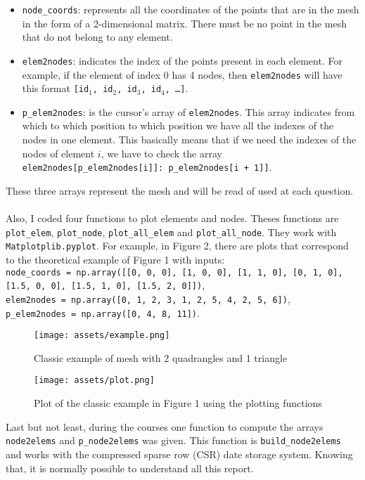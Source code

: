 \documentclass[a4paper]{article}
\begin{document}
\begin{itemize}
    \item \texttt{node\_coords}: represents all the coordinates of the points that are in the mesh in the form of a 2-dimensional matrix. There must be no point in the mesh that do not belong to any element.
    \item \texttt{elem2nodes}: indicates the index of the points present in each element. For example, if the element of index $0$ has 4 nodes, then \texttt{elem2nodes} will have this format \texttt{[id$_1$, id$_2$, id$_3$, id$_4$, \dots]}.
    \item \texttt{p\_elem2nodes}: is the cursor's array of \texttt{elem2nodes}. This array indicates from which to which position to which position we have all the indexes of the nodes in one element. This basically means that if we need the indexes of the nodes of element $i$, we have to check the array \texttt{elem2nodes[p\_elem2nodes[i]]: p\_elem2nodes[i + 1]]}.
\end{itemize}
These three arrays represent the mesh and will be read of used at each question.\\ \\
Also, I coded four functions to plot elements and nodes. Theses functions are \texttt{plot\_elem}, \texttt{plot\_node}, \texttt{plot\_all\_elem} and \texttt{plot\_all\_node}. They work with \texttt{Matplotplib.pyplot}. For example, in Figure 2, there are plots that correspond to the theoretical example of Figure 1 with inputs:\\ 
\texttt{node\_coords = np.array([[0, 0, 0], [1, 0, 0], [1, 1, 0], [0, 1, 0], [1.5, 0, 0], [1.5, 1, 0], [1.5, 2, 0]])},\\
\texttt{elem2nodes = np.array([0, 1, 2, 3, 1, 2, 5, 4, 2, 5, 6])},\\
\texttt{p\_elem2nodes = np.array([0, 4, 8, 11])}.
\begin{figure}[H]
    \centering
    \texttt{[image: assets/example.png]}
    \caption{Classic example of mesh with 2 quadrangles and 1 triangle}
    \label{fig:classic_example}
\end{figure}
\begin{figure}[H]
    \centering
    \texttt{[image: assets/plot.png]}
    \caption{Plot of the classic example in Figure 1 using the plotting functions}
    \label{fig:plot_classic_example}
\end{figure}
\noindent Last but not least, during the courses one function to compute the arrays \texttt{node2elems} and \texttt{p\_node2elems} was given. This function is \texttt{build\_node2elems} and works with the compressed sparse row (CSR) date storage system. Knowing that, it is normally possible to understand all this report.
\end{document}
